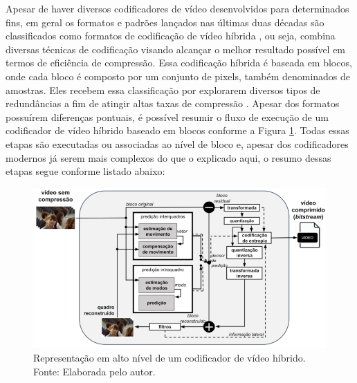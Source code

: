 Apesar de haver diversos codificadores de vídeo desenvolvidos para determinados fins, em geral os formatos e padrões lançados nas últimas duas décadas são classificados como formatos de codificação de vídeo híbrida \cite{bib:richardson_2002}, ou seja, combina diversas técnicas de codificação visando alcançar o melhor resultado possível em termos de eficiência de compressão. Essa codificação híbrida é baseada em blocos, onde cada bloco é composto por um conjunto de pixels, também denominados de amostras. Eles recebem essa classificação por explorarem diversos tipos de redundâncias a fim de atingir altas taxas de compressão \cite{bib:tese_agostini_2007}. Apesar dos formatos possuírem diferenças pontuais, é possível resumir o fluxo de execução de um codificador de vídeo híbrido baseado em blocos conforme a Figura \ref{fig:2}. Todas essas etapas são executadas ou associadas ao nível de bloco e, apesar dos codificadores modernos já serem mais complexos do que o explicado aqui, o resumo dessas etapas segue conforme listado abaixo:

\begin{figure}
    \centering
    \includegraphics[width=\textwidth]{FIGURES/fig_2.png}
    \caption{Representação em alto nível de um codificador de vídeo híbrido. Fonte: Elaborada pelo autor.}
    \label{fig:2}
\end{figure}


